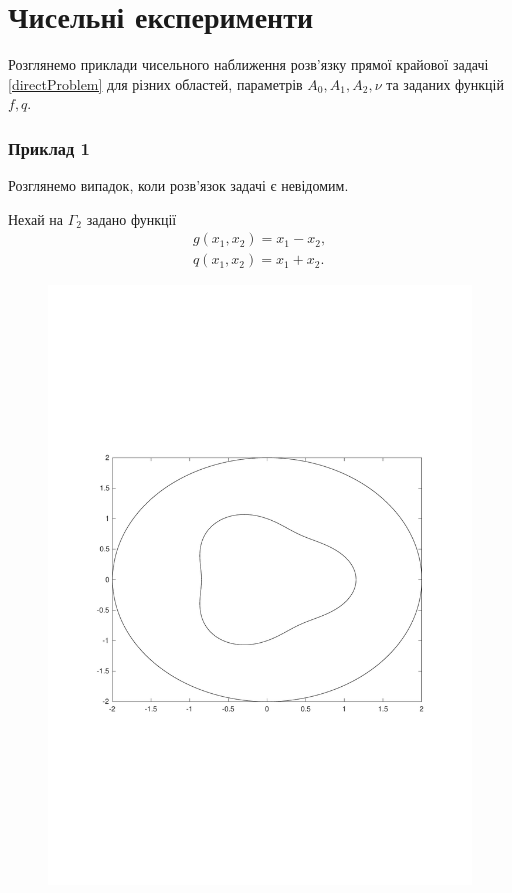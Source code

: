 \documentclass[12pt]{report}
\begin{document}
\chapter{Чисельні експерименти}

Розглянемо приклади чисельного наближення розв'язку прямої крайової задачі \eqref{directProblem} для різних областей, параметрів $A_0,A_1,A_2,\nu$ та заданих функцій $f, q$.

\subsection{Приклад 1}
Розглянемо випадок, коли розв'язок задачі є невідомим.

Нехай на $\Gamma_2$ задано функції
  \begin{gather*}
	g(x_1, x_2) = x_1-x_2,\\
	q(x_1, x_2) = x_1 +x_2.
 \end{gather*}
 
 \begin{figure}[h!]
\centering
	\vspace*{-4cm}
	\includegraphics[scale=.5]{sample1.pdf}
	\vspace*{-3.5cm}
\end{figure}
\end{document}
